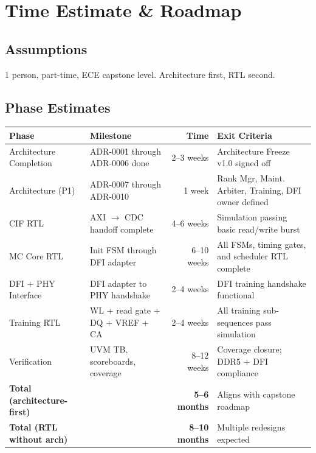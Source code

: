\documentclass[10pt,a4paper]{article}
\newcommand{\Th}[1]{\cellcolor{thbg}\textbf{\small\color{acc1}#1}}
\newcommand{\RA}{\rowcolor{white}}
\newcommand{\RB}{\rowcolor{altbg}}
\begin{document}
\section{Time Estimate \& Roadmap}

\subsection{Assumptions}

1 person, part-time, ECE capstone level. Architecture first, RTL second.

\subsection{Phase Estimates}

\begin{center}
\begin{tabularx}{\linewidth}{@{} l l r X @{}}
\toprule
\Th{Phase} & \Th{Milestone} & \Th{Time} & \Th{Exit Criteria} \\
\midrule
\RA Architecture Completion & ADR-0001 through ADR-0006 done & 2--3 weeks &
  Architecture Freeze v1.0 signed off \\
\RB Architecture (P1) & ADR-0007 through ADR-0010 & 1 week &
  Rank Mgr, Maint. Arbiter, Training, DFI owner defined \\
\RA CIF RTL & AXI $\to$ CDC handoff complete & 4--6 weeks &
  Simulation passing basic read/write burst \\
\RB MC Core RTL & Init FSM through DFI adapter & 6--10 weeks &
  All FSMs, timing gates, and scheduler RTL complete \\
\RA DFI + PHY Interface & DFI adapter to PHY handshake & 2--4 weeks &
  DFI training handshake functional \\
\RB Training RTL & WL + read gate + DQ + VREF + CA & 2--4 weeks &
  All training sub-sequences pass simulation \\
\RA Verification & UVM TB, scoreboards, coverage & 8--12 weeks &
  Coverage closure; DDR5 + DFI compliance \\
\midrule
\RA \textbf{Total (architecture-first)} & & \textbf{5--6 months} & Aligns with capstone roadmap \\
\RB \textbf{Total (RTL without arch)} & & \textbf{8--10 months} & Multiple redesigns expected \\
\bottomrule
\end{tabularx}
\end{center}
\end{document}
